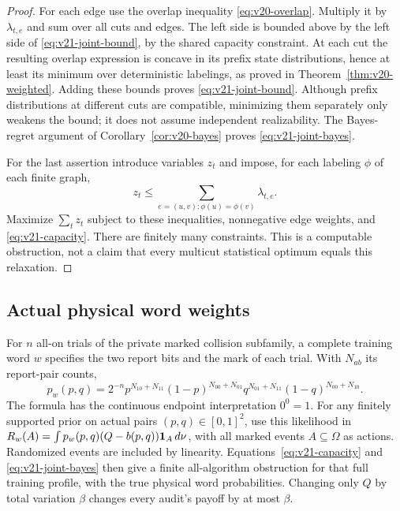 \begin{proof}
For each edge use the overlap inequality
\eqref{eq:v20-overlap}. Multiply it by $\lambda_{t,e}$ and sum over
all cuts and edges. The left side is bounded above by the left side of
\eqref{eq:v21-joint-bound}, by the shared capacity constraint. At each
cut the resulting overlap expression is concave in its prefix state
distributions, hence at least its minimum over deterministic labelings,
as proved in Theorem~\ref{thm:v20-weighted}. Adding these bounds proves
\eqref{eq:v21-joint-bound}. Although prefix distributions at different
cuts are compatible, minimizing them separately only weakens the bound;
it does not assume independent realizability. The Bayes-regret argument
of Corollary~\ref{cor:v20-bayes} proves \eqref{eq:v21-joint-bayes}.

For the last assertion introduce variables $z_t$ and impose, for each
labeling $\phi$ of each finite graph,
\[
 z_t\le\sum_{e=(u,v):\phi(u)=\phi(v)}\lambda_{t,e}.
\]
Maximize $\sum_tz_t$ subject to these inequalities, nonnegative edge
weights, and \eqref{eq:v21-capacity}. There are finitely many constraints.
This is a computable obstruction, not a claim that every multicut
statistical optimum equals this relaxation.
\end{proof}

\subsection{Actual physical word weights}
For $n$ all-on trials of the private marked collision subfamily, a complete
training word $w$ specifies the two report bits and the mark of each
trial. With $N_{ab}$ its report-pair counts,
\begin{equation}\label{eq:v21-physical-weight}
 p_w(p,q)=2^{-n}
 p^{N_{10}+N_{11}}(1-p)^{N_{00}+N_{01}}
 q^{N_{01}+N_{11}}(1-q)^{N_{00}+N_{10}}.
\end{equation}
The formula has the continuous endpoint interpretation $0^0=1$.
For any finitely supported prior on actual pairs $(p,q)\in[0,1]^2$,
use this likelihood in $R_w(A)=\int p_w(p,q)(Q-b(p,q))\mathbf 1_A\,d\nu$,
with all marked events $A\subseteq\Omega$ as actions. Randomized events
are included by linearity. Equations~\eqref{eq:v21-capacity} and
\eqref{eq:v21-joint-bayes} then give a finite all-algorithm obstruction
for that full training profile, with the true physical word probabilities.
Changing only $Q$ by total variation $\beta$ changes every audit's
payoff by at most $\beta$.

